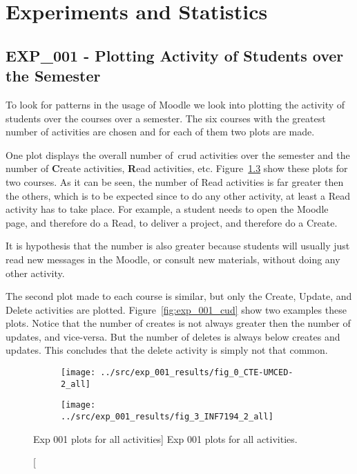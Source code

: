 \chapter{Experiments and Statistics}

\section{EXP\_001 - Plotting Activity of Students over the Semester}

To look for patterns in the usage of Moodle we look into plotting the activity
of students over the courses over a semester. The six courses with the greatest
number of activities are chosen and for each of them two plots are made.

One plot displays the overall number of~\gls{crud} activities over the semester
and the number of \textbf{C}reate activities, \textbf{R}ead activities, etc.
Figure~\ref{fig:exp_001_all} show these plots for two courses. As it can be
seen, the number of Read activities is far greater then the others, which is to
be expected since to do any other activity, at least a Read activity has to
take place. For example, a student needs to open the Moodle page, and therefore
do a Read, to deliver a project, and therefore do a Create.

It is hypothesis that the number is also greater because students will usually
just read new messages in the Moodle, or consult new materials, without doing
any other activity.

The second plot made to each course is similar, but only the Create, Update,
and Delete activities are plotted. Figure~\ref{fig:exp_001_cud} show two
examples these plots. Notice that the number of creates is not always greater
then the number of updates, and vice-versa. But the number of deletes is always
below creates and updates. This concludes that the delete activity is simply
not that common.

\begin{figure}[h!]
    \centering

    \begin{subfigure}{.5\textwidth}
        \centering
        \texttt{[image: ../src/exp\_001\_results/fig\_0\_CTE-UMCED-2\_all]}
        \label{subfig:exp_001_0_all}
    \end{subfigure}%
    \begin{subfigure}{.5\textwidth}
        \centering
        \texttt{[image: ../src/exp\_001\_results/fig\_3\_INF7194\_2\_all]}
        \label{subfig:exp_001_3_all}
    \end{subfigure}

    \caption
        [Exp 001 plots for all activities]
        {Exp 001 plots for all activities.}

    \label{fig:exp_001_all}
\end{figure}

